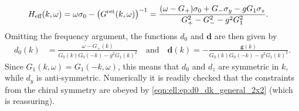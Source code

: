 \begin{align*}
H_\eff(k,\omega) &= \omega\sigma_0 - \kla*{G^\ret(k,\omega)}^{-1} = \frac{\kla*{\omega - G_+} \sigma_0 + G_-\sigma_y - gG_1\sigma_z}{G_+^2 - G_-^2 - g^2G_1^2}. %
\end{align*}
Omitting the frequency argument, the functions $d_0$ and $\textbf{d}$ are then given by
\begin{align}
d_0(k) &= \frac{\omega - G_+(k)}{G_0(k) G_0(-k) - g^2G_1(k)^2} \quad \text{and} \quad \textbf{d}(k) = -\frac{\textbf{g}(k)}{G_0(k) G_0(-k) - g^2G_1(k)^2}. \label{eqn:ell:ep:d0_dk_general_2x2}
\end{align}
Since $G_1(k,\omega)=G_1(-k,\omega)$, this means that $d_0$ and $d_z$ are symmetric in $k$, while $d_y$ is anti-symmetric.
Numerically it is readily checked that the constraints from the chiral symmetry are obeyed by \autoref{eqn:ell:ep:d0_dk_general_2x2} (which is reassuring).
